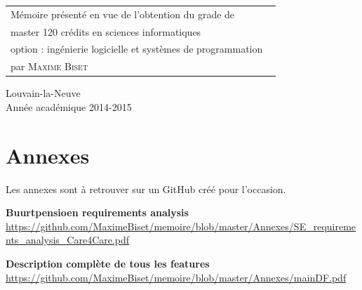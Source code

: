 \documentclass[british]{article}
\renewcommand\title{Analyse et développement d'un framework open source d'online banking pour des organisations d'échange social en monnaies complémentaires}
\newcommand\name{\textsc{Maxime Biset}}
\newcommand\years{2014-2015}
\begin{document}
\begin{minipage}{.5\textwidth}
\begin{tabular}{l}
Mémoire présenté en vue de l'obtention du grade de
\\ master 120 crédits en sciences informatiques
\\ option : ingénierie logicielle et systèmes de programmation \
\\ par \name \
\end{tabular}
\end{minipage}
\vfill
\begin{center}
Louvain-la-Neuve
\\ Année académique \years
\end{center}





\newpage



\newpage
\tableofcontents
\newpage
{}

















\newpage

\nocite{*}


\appendix

\section{Annexes}
Les annexes sont à retrouver sur un GitHub créé pour l'occasion.

\textbf{Buurtpensioen requirements analysis}\\
\label{bpse}
\url{https://github.com/MaximeBiset/memoire/blob/master/Annexes/SE_requirements_analysis_Care4Care.pdf}

\textbf{Description complète de tous les features}\\
\label{featureDescr}
\url{https://github.com/MaximeBiset/memoire/blob/master/Annexes/mainDF.pdf}
\end{document}
